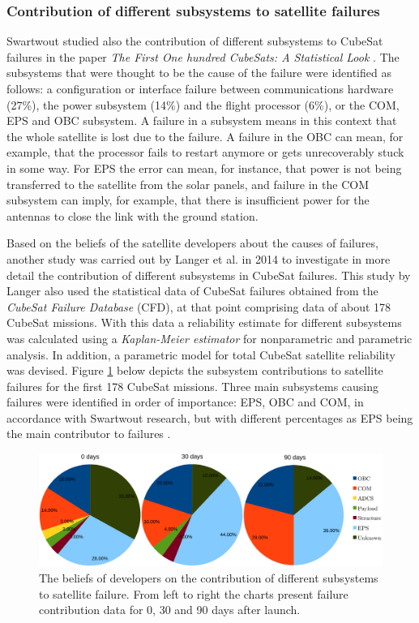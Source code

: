 \documentclass[english,12pt,a4paper,pdftex,elec,utf8]{aaltothesis}
\begin{document}
\subsubsection{Contribution of different subsystems to satellite failures}
Swartwout studied also the contribution of different subsystems to CubeSat failures in the paper \textit{The First One hundred CubeSats: A Statistical Look} \cite{Swart1}. The subsystems that were thought to be the cause of the failure were identified as follows: a configuration or interface failure between communications hardware (27\%), the power subsystem (14\%) and the flight processor (6\%), or the COM, EPS and OBC subsystem. A failure in a subsystem means in this context that the whole satellite is lost due to the failure. A failure in the OBC can mean, for example, that the processor fails to restart anymore or gets unrecoverably stuck in some way. For EPS the error can mean, for instance, that power is not being transferred to the satellite from the solar panels, and failure in the COM subsystem can imply, for example, that there is insufficient power for the antennas to close the link with the ground station.  \cite{Swart1}\par
Based on the beliefs of the satellite developers about the causes of failures, another study was carried out by Langer et al. in 2014 \cite{Langer} to investigate in more detail the contribution of different subsystems in CubeSat failures. This study by Langer also used the statistical data of CubeSat failures obtained from the \textit{CubeSat Failure Database} (CFD), at that point comprising data of about 178 CubeSat missions. With this data a reliability estimate for different subsystems was calculated using a \textit{Kaplan-Meier estimator} for nonparametric and parametric analysis. In addition, a parametric model for total CubeSat satellite reliability was devised. Figure \ref{subsystemfailures} below depicts the subsystem contributions to satellite failures for the first 178 CubeSat missions. Three main subsystems causing failures were identified in order of importance: EPS, OBC and COM, in accordance with Swartwout research, but with different percentages as EPS being the main contributor to failures \cite{Langer, Swart1}. \par
\begin{figure}[h!]
\centering
\includegraphics[scale=0.5]{subsystemmerge}
\caption{The beliefs of developers on the contribution of different subsystems to satellite failure. From left to right the charts present failure contribution data for 0, 30 and 90 days after launch. \cite{Langer}}
\label{subsystemfailures}
\end{figure}  
\end{document}
